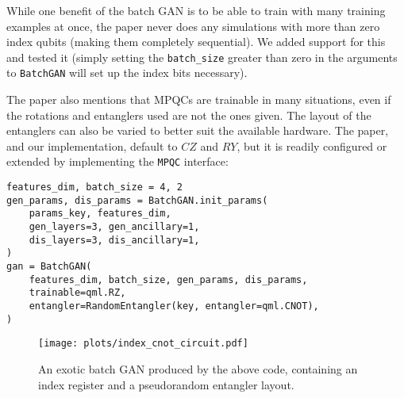 While one benefit of the batch GAN is to be able to train with many training
examples at once, the paper never does any simulations with more than zero
index qubits (making them completely sequential).  We added support for this
and tested it (simply setting the \texttt{batch\_size} greater than zero in the arguments to
\texttt{BatchGAN} will set up the index bits necessary).

The paper also mentions that MPQCs are trainable in many situations, even if
the rotations and entanglers used are not the ones given.  The layout of the entanglers can also be varied to better suit the available hardware.  The paper, and our
implementation, default to $CZ$ and $RY$, but it is readily configured or extended by implementing the \texttt{MPQC} interface:

\begin{verbatim}
features_dim, batch_size = 4, 2
gen_params, dis_params = BatchGAN.init_params(
    params_key, features_dim,
    gen_layers=3, gen_ancillary=1, 
    dis_layers=3, dis_ancillary=1,
)
gan = BatchGAN(
    features_dim, batch_size, gen_params, dis_params,
    trainable=qml.RZ,
    entangler=RandomEntangler(key, entangler=qml.CNOT),
)
\end{verbatim}

\begin{figure}[H]
    \centering
    \texttt{[image: plots/index\_cnot\_circuit.pdf]}
    \caption{An exotic batch GAN produced by the above code, containing an index register and a pseudorandom entangler layout.}
    \label{fig:index_circuit}
\end{figure}

